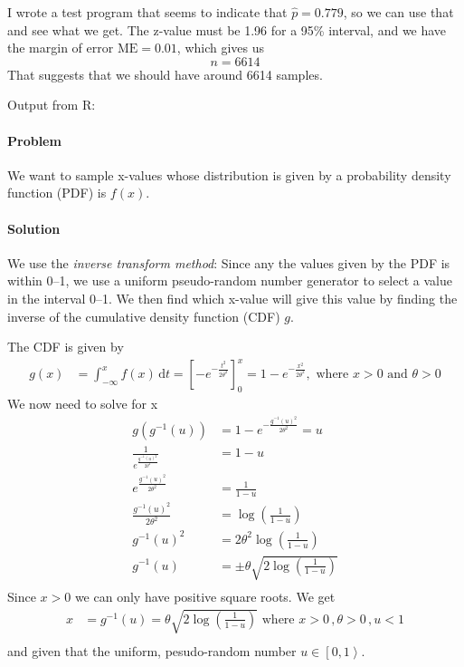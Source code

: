 \documentclass[a4paper,english,12pt]{article}
\begin{document}
I wrote a test program that seems to indicate that $\hat{p} = 0.779$, so we can
use that and see what we get.  The z-value must be 1.96 for a 95\%{} interval,
and we have the margin of error $\text{ME} = 0.01$, which gives us
\[
  n = 6614
\]
That suggests that we should have around 6614 samples.

Output from R:

\paragraph{Problem} We want to sample x-values whose distribution is given by a
probability density function (PDF) is $f(x)$.
\paragraph{Solution} We use the \textit{inverse transform method}: Since any
the values given by the PDF is within 0--1, we use a uniform pseudo-random
number generator to select a value in the interval 0--1. We then find which
x-value will give this value by finding the inverse of the cumulative density
function (CDF) $g$.

The CDF is given by
\begin{align*}
  g(x) & = \int_{-\infty}^{x} f(x)\, \mathrm{d}t 
     = \left[ -e^{-\frac{t^2}{2\theta^2}} \right]_0^{x} = 
     1 - e^{-\frac{x^2}{2\theta^2}}, \text{ where } x>0 \text{ and } \theta > 0
\end{align*}
We now need to solve for x
\begin{align*}
  g(g^{-1}(u)) &= 1 - e^{-\frac{g^{-1}(u)^2}{2\theta^2}} = u \\
   \frac{1}{e^\frac{g^{-1}(u)^2}{2\theta^2} } &= 1 - u \\
   e^\frac{g^{-1}(u)^2}{2\theta^2}  &= \frac{1}{1 - u} \\
   \frac{g^{-1}(u)^2}{2\theta^2}  &= \log{\left(\frac{1}{1 - u}\right)} \\
   g^{-1}(u)^2  &= 2\theta^2\log{\left(\frac{1}{1 - u}\right)} \\
   g^{-1}(u)  &= \pm\theta\sqrt{2\log{\left(\frac{1}{1 - u}\right)}} \\
\end{align*}
Since $x > 0$ we can only have positive square roots. We get
\begin{align*}
    x &= g^{-1}(u) = \theta\sqrt{2\log{\left(\frac{1}{1 - u}\right)}}
   \text{ where } x>0\, , \theta>0\, , u<1
   \\
\end{align*}%
and given that the uniform, pesudo-random number $u \in \left[ 0,1 \right>$.
\end{document}

